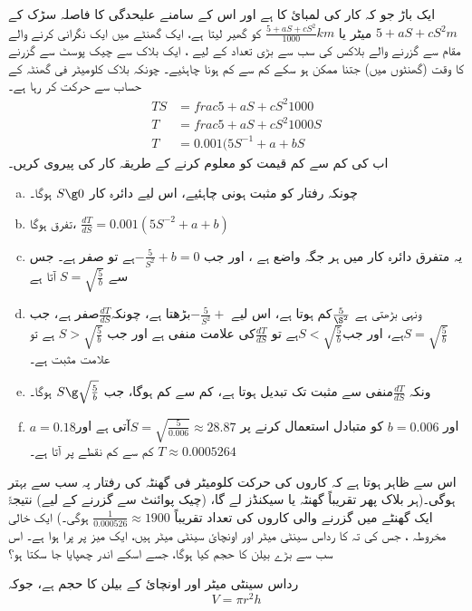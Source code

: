 ایک باڑ جو کہ کار کی لمبائ کا ہے اور اس کے سامنے علیحدگی کا فاصلہ سڑک کے  $5+aS+cS^2\si{m}$ میٹر  یا 
  $\frac{5+aS+cS^2}{1000}\si{km} $
کو گھیر لیتا ہے، ایک گھنٹے میں ایک نگرانی کرنے والے مقام سے گزرنے والے بلاکس کی سب سے بڑی تعداد کے لیے ، ایک بلاک سے چیک پوسٹ سے گزرنے کا وقت  (گھنٹوں میں) جتنا ممکن ہو سکے کم سے کم ہونا چاہئیے۔ چونکہ بلاک  کلومیٹر فی گھنٹہ کے حساب سے حرکت کر رہا ہے۔
\begin{align*}
TS&=frac{5+aS+cS^2}{1000}\\
T&=frac{5+aS+cS^2}{1000S}\\
T&=0.001(5S^{-1}+a+bS
\end{align*}
اب    کی کم سے کم  قیمت کو معلوم کرنے کے طریقہ کار کی پیروی کریں۔ 
\begin{enumerate}[a.]
\item
چونکہ رفتار کو مثبت ہونی چاہئیے، اس لیے دائرہ کار \( S \g 0 \) ہوگا۔
\item
تفرق ہوگا،  \( \frac{dT}{dS}= 0.001(5S^{-2}+a+b)\)
\item
یہ متفرق دائرہ کار میں ہر جگہ واضع ہے ، اور جب \( -\frac{5}{S^2}+b=0  \)ہے تو صفر ہے۔ 
جس سے  \(S=\sqrt{\frac{5}{b}}\) آتا ہے
\item
ونہی   بڑھتی ہے  \( \frac{5}{\S^2}\)کم ہوتا ہے، اس لیے  \(-\frac{5}{S^2}+ \)بڑھتا ہے، چونکہ\(\frac{dT}{dS}\)صفر ہے، جب \(S=\sqrt{\frac{5}{b}}\)ہے، اور جب\(S<\sqrt{\frac{5}{b}}\)ہے تو  \(\frac{dT}{dS}\)کی علامت منفی ہے اور جب  \(S>\sqrt{\frac{5}{b}}\) ہے تو علامت مثبت ہے۔
\item
ونکہ \(\frac{dT}{dS}\)منفی سے مثبت تک تبدیل ہوتا ہے،    کم سے کم ہوگا، جب \(   S\g \sqrt{\frac{5}{b}}  \) ہوگا۔
\item
\( a=0.18  \)اور  \( b=0.006  \)  کو متبادل استعمال کرنے پر   
\( S=\sqrt{\frac{5}{0.006}}\approx 28.87 \)آتی ہے اور     \(  T\approx 0.0005264  \)  کم سے کم نقطے پر آتا ہے۔ 
\end{enumerate}
 
اس سے ظاہر ہوتا ہے کہ کاروں کی حرکت    کلومیٹر فی گھنٹہ کی رفتار پہ سب سے بہتر ہوگی۔(ہر بلاک پھر تقریباً   گھنٹہ یا    سیکنڈز لے گا، (چیک پوائنٹ سے گزرنے کے لیے) نتیجۃً ایک گھنٹے میں گزرنے والی کاروں کی تعداد تقریباً      \( \frac{1}{0.000526} \approx 1900 \) ہوگی۔)
%
ایک خالی مخروطہ ، جس کی تہ کا رداس   سینٹی میٹر اور اونچائ  سینٹی میٹر ہیں، ایک میز پر پرا ہوا ہے۔ اس سب سے بڑے بیلن کا حجم کیا ہوگا، جسے اسکے اندر چھپایا جا سکتا ہو؟

رداس   سینٹی میٹر اور اونچائ   کے بیلن کا حجم    ہے، جوکہ   \[V=\pi r^2h\]

